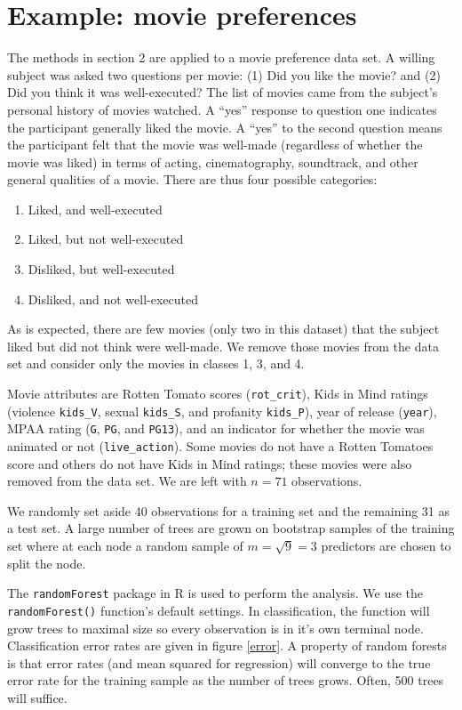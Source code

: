\section{Example: movie preferences}

The methods in section 2 are applied to a movie preference data set. A willing subject was asked two questions per movie: (1) Did you like the movie? and (2) Did you think it was well-executed? The list of movies came from the subject's personal history of movies watched. A ``yes'' response to question one indicates the participant generally liked the movie. A ``yes'' to the second question means the participant felt that the movie was well-made (regardless of whether the movie was liked) in terms of acting, cinematography, soundtrack, and other general qualities of a movie. There are thus four possible categories:
\begin{enumerate}
\item Liked, and well-executed
\item Liked, but not well-executed
\item Disliked, but well-executed
\item Disliked, and not well-executed
\end{enumerate}
As is expected, there are few movies (only two in this dataset) that the subject liked but did not think were well-made. We remove those movies from the data set and consider only the movies in classes 1, 3, and 4.

Movie attributes are Rotten Tomato scores (\texttt{rot\_crit}), Kids in Mind ratings (violence \texttt{kids\_V}, sexual \texttt{kids\_S}, and profanity \texttt{kids\_P}), year of release (\texttt{year}), MPAA rating (\texttt{G}, \texttt{PG}, and \texttt{PG13}), and an indicator for whether the movie was animated or not (\texttt{live\_action}). Some movies do not have a Rotten Tomatoes score and others do not have Kids in Mind ratings; these movies were also removed from the data set. We are left with $n=71$ observations.

We randomly set aside 40 observations for a training set and the remaining 31 as a test set. A large number of trees are grown on bootstrap samples of the training set where at each node a random sample of $m=\sqrt{9}=3$ predictors are chosen to split the node.

The \texttt{randomForest} package in R is used to perform the analysis. We use the \texttt{randomForest()} function's default settings. In classification, the function will grow trees to maximal size so every observation is in it's own terminal node. Classification error rates are given in figure \ref{error}. A property of random forests is that error rates (and mean squared for regression) will converge to the true error rate for the training sample as the number of trees grows. Often, 500 trees will suffice.

